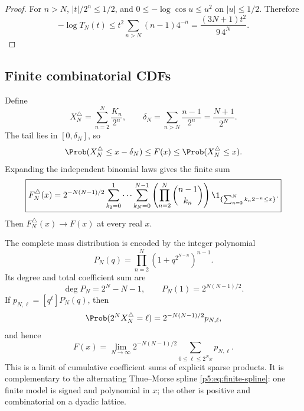 \documentclass[11pt,oneside]{article}
\theoremstyle{definition}
\begin{document}
\begin{proof}
For $n>N$, $|t|/2^n\le1/2$, and
$0\le-\log\cos u\le u^2$ on $|u|\le1/2$.  Therefore
\[
 -\log T_N(t)
 \le t^2\sum_{n>N}(n-1)4^{-n}
 =\frac{(3N+1)t^2}{9\,4^N}.
\]
\end{proof}

\subsection{Finite combinatorial CDFs}

Define
\begin{equation}
 X_N^\triangle=\sum_{n=2}^{N}\frac{K_n}{2^n},
 \qquad
 \delta_N=\sum_{n>N}\frac{n-1}{2^n}=\frac{N+1}{2^N}.    \label{p5:eq:triangular-truncation}
\end{equation}
The tail lies in $[0,\delta_N]$, so
\begin{equation}
 \Prob(X_N^\triangle\le x-\delta_N)
 \le F(x)\le
 \Prob(X_N^\triangle\le x).                             \label{p5:eq:triangular-cdf-bracket}
\end{equation}
Expanding the independent binomial laws gives the finite sum
\begin{equation}
 \boxed{\displaystyle
 F_N^\triangle(x)=2^{-N(N-1)/2}
 \sum_{k_2=0}^{1}\cdots\sum_{k_N=0}^{N-1}
 \left(\prod_{n=2}^{N}\binom{n-1}{k_n}\right)
 \1_{\{\sum_{n=2}^{N}k_n2^{-n}\le x\}}.}              \label{p5:eq:triangular-cdf}
\end{equation}
Then $F_N^\triangle(x)\to F(x)$ at every real $x$.

The complete mass distribution is encoded by the integer polynomial
\begin{equation}
 \boxed{\displaystyle
 P_N(q)=\prod_{n=2}^{N}
       \left(1+q^{2^{N-n}}\right)^{n-1}.}                \label{p5:eq:triangular-polynomial}
\end{equation}
Its degree and total coefficient sum are
\begin{equation}
 \deg P_N=2^N-N-1,
 \qquad
 P_N(1)=2^{N(N-1)/2}.                                    \label{p5:eq:triangular-polynomial-data}
\end{equation}
If $p_{N,\ell}=[q^\ell]P_N(q)$, then
\begin{equation}
 \Prob(2^NX_N^\triangle=\ell)
 =2^{-N(N-1)/2}p_{N,\ell},                              \label{p5:eq:triangular-mass}
\end{equation}
and hence
\begin{equation}
 F(x)=\lim_{N\to\infty}
 2^{-N(N-1)/2}
 \sum_{0\le\ell\le2^Nx}p_{N,\ell}.                    \label{p5:eq:triangular-coefficient-limit}
\end{equation}
This is a limit of cumulative coefficient sums of explicit sparse products.
It is complementary to the alternating Thue--Morse spline
\eqref{p5:eq:finite-spline}: one finite model is signed and polynomial in $x$;
the other is positive and combinatorial on a dyadic lattice.
\end{document}
